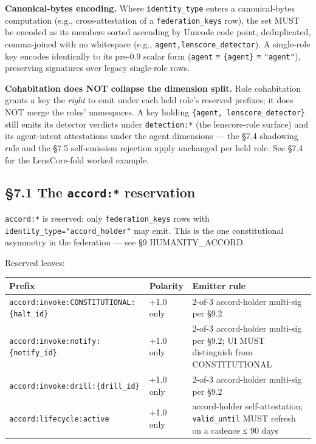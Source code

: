 \documentclass[10pt]{article}
\begin{document}
\textbf{Canonical-bytes encoding.} Where \texttt{identity\_type} enters a canonical-bytes computation (e.g., cross-attestation of a \texttt{federation\_keys} row), the set MUST be encoded as its members sorted ascending by Unicode code point, deduplicated, comma-joined with no whitespace (e.g., \texttt{agent,lenscore\_detector}). A single-role key encodes identically to its pre-0.9 scalar form (\texttt{agent} ≡ \texttt{\{agent\}} ≡ \texttt{"agent"}), preserving signatures over legacy single-role rows.


\textbf{Cohabitation does NOT collapse the dimension split.} Role cohabitation grants a key the \textit{right} to emit under each held role's reserved prefixes; it does NOT merge the roles' namespaces. A key holding \texttt{\{agent, lenscore\_detector\}} still emits its detector verdicts under \texttt{detection:*} (the lenscore-role surface) and its agent-intent attestations under the agent dimensions — the §7.4 shadowing rule and the §7.5 self-emission rejection apply unchanged per held role. See §7.4 for the LensCore-fold worked example.


\subsection*{§7.1 The \texttt{accord:*} reservation}


\texttt{accord:*} is reserved: only \texttt{federation\_keys} rows with \texttt{identity\_type="accord\_holder"} may emit. This is the one constitutional asymmetry in the federation — see §9 HUMANITY\_ACCORD.


Reserved leaves:


{\footnotesize
\begin{longtable}{|p{5.33cm}|p{5.33cm}|p{5.33cm}|}\hline
\textbf{Prefix} & \textbf{Polarity} & \textbf{Emitter rule} \\ \hline\endhead
\texttt{accord:invoke:CONSTITUTIONAL:\{halt\_id\}} & +1.0 only & 2-of-3 accord-holder multi-sig per §9.2 \\ \hline
\texttt{accord:invoke:notify:\{notify\_id\}} & +1.0 only & 2-of-3 accord-holder multi-sig per §9.2; UI MUST distinguish from CONSTITUTIONAL \\ \hline
\texttt{accord:invoke:drill:\{drill\_id\}} & +1.0 only & 2-of-3 accord-holder multi-sig per §9.2 \\ \hline
\texttt{accord:lifecycle:active} & +1.0 only & accord-holder self-attestation; \texttt{valid\_until} MUST refresh on a cadence ≤ 90 days \\ \hline
\end{longtable}}
\end{document}
